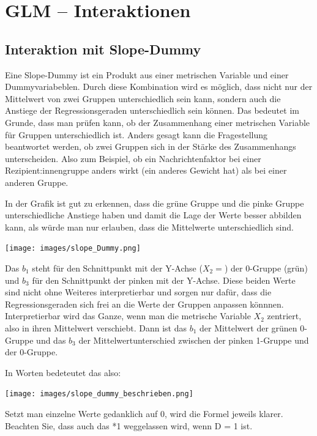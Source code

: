 \documentclass[
  10pt,
  letterpaper,
  a4paper, twoside]{scrreprt}
\begin{document}

\chapter{GLM -- Interaktionen}\label{glm-interaktionen}

\section{Interaktion mit Slope-Dummy}\label{interaktion-mit-slope-dummy}

Eine Slope-Dummy ist ein Produkt aus einer metrischen Variable und einer
Dummyvariabeblen. Durch diese Kombination wird es möglich, dass nicht
nur der Mittelwert von zwei Gruppen unterschiedlich sein kann, sondern
auch die Anstiege der Regressionsgeraden unterschiedlich sein können.
Das bedeutet im Grunde, dass man prüfen kann, ob der Zusammenhang einer
metrischen Variable für Gruppen unterschiedlich ist. Anders gesagt kann
die Fragestellung beantwortet werden, ob zwei Gruppen sich in der Stärke
des Zusammenhangs unterscheiden. Also zum Beispiel, ob ein
Nachrichtenfaktor bei einer Rezipient:innengruppe anders wirkt (ein
anderes Gewicht hat) als bei einer anderen Gruppe.

In der Grafik ist gut zu erkennen, dass die grüne Gruppe und die pinke
Gruppe unterschiedliche Anstiege haben und damit die Lage der Werte
besser abbilden kann, als würde man nur erlauben, dass die Mittelwerte
unterschiedlich sind.

\texttt{[image: images/slope\_Dummy.png]}

Das \(b_1\) steht für den Schnittpunkt mit der Y-Achse (\(X_2=\)) der
0-Gruppe (grün) und \(b_3\) für den Schnittpunkt der pinken mit der
Y-Achse. Diese beiden Werte sind nicht ohne Weiteres interpretierbar und
sorgen nur dafür, dass die Regressionsgeraden sich frei an die Werte der
Gruppen anpassen könnnen. Interpretierbar wird das Ganze, wenn man die
metrische Variable \(X_2\) zentriert, also in ihren Mittelwert
verschiebt. Dann ist das \(b_1\) der Mittelwert der grünen 0-Gruppe und
das \(b_3\) der Mittelwertunterschied zwischen der pinken 1-Gruppe und
der 0-Gruppe.

In Worten bedeteutet das also:

\texttt{[image: images/slope\_dummy\_beschrieben.png]}

Setzt man einzelne Werte gedanklich auf 0, wird die Formel jeweils
klarer. Beachten Sie, dass auch das *1 weggelassen wird, wenn D = 1 ist.
\end{document}
